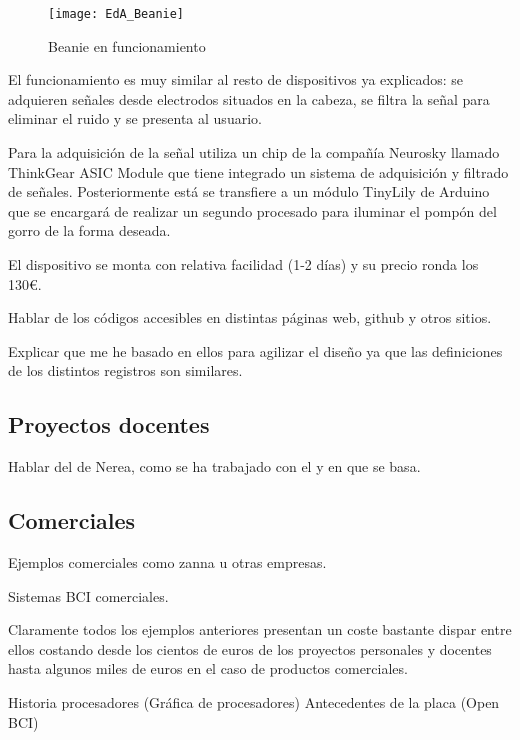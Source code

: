 \begin{figure} [h]
    \centering
    \texttt{[image: EdA\_Beanie]}
    \caption{Beanie en funcionamiento}
    \label{fig:EdA_Beanie}
\end{figure}

El funcionamiento es muy similar al resto de dispositivos ya explicados: se adquieren señales desde electrodos situados en la cabeza, se filtra la señal para eliminar el ruido y se presenta al usuario.

Para la adquisición de la señal utiliza un chip de la compañía Neurosky llamado ThinkGear ASIC Module que tiene integrado un sistema de adquisición y filtrado de señales. Posteriormente está se transfiere a un módulo TinyLily de Arduino que se encargará de realizar un segundo procesado para iluminar el pompón del gorro de la forma deseada.

El dispositivo se monta con relativa facilidad (1-2 días) y su precio ronda los 130€.

Hablar de los códigos accesibles en distintas páginas web, github y otros sitios.

Explicar que me he basado en ellos para agilizar el diseño ya que las definiciones de los distintos registros son similares.

\subsection{Proyectos docentes\label{sec:Pro_docentes}}

Hablar del de Nerea, como se ha trabajado con el y en que se basa.

\subsection{Comerciales\label{sec:Pro_empresa}}

Ejemplos comerciales como zanna u otras empresas.

Sistemas BCI comerciales.

Claramente todos los ejemplos anteriores presentan un coste bastante dispar entre ellos costando desde los cientos de euros de los proyectos personales y docentes hasta algunos miles de euros en el caso de productos comerciales.

Historia procesadores (Gráfica de procesadores)
Antecedentes de la placa (Open BCI)